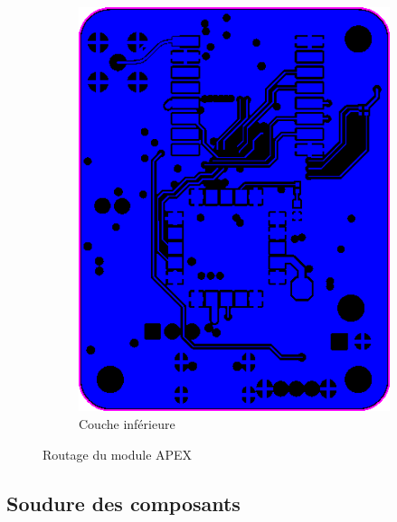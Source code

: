 \documentclass{article}
\begin{document}
\begin{figure}[h!]
\begin{subfigure}{0.40\textwidth}
        \includegraphics[width=\textwidth]{image/BottomLayer.png}
        \caption{Couche inférieure}
        \label{fig:apex_bottom_layer}
    \end{subfigure}
    \caption{Routage du module APEX}
    \label{fig:apex_routing}
\end{figure}

\newpage

\newpage

\subsection{Soudure des composants}
\end{document}
